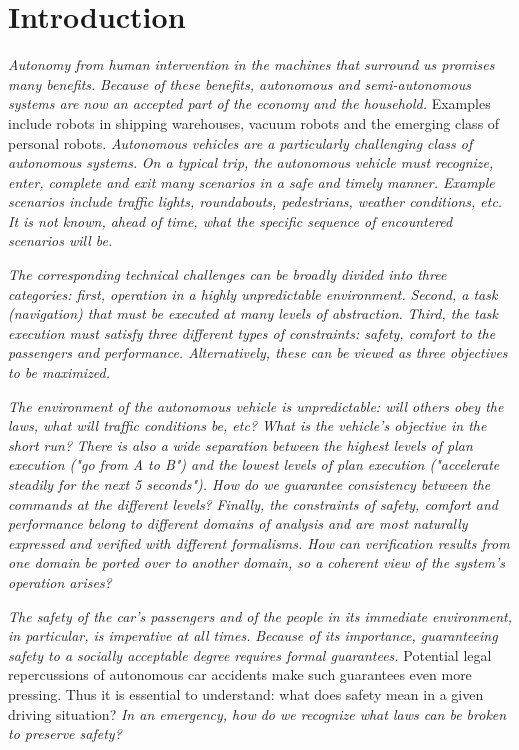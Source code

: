 \section{Introduction}
\label{introduction}

{\it Autonomy from human intervention in the machines that surround us promises many benefits.}
{\it Because of these benefits, autonomous and semi-autonomous systems are now an accepted part of the economy and the household.}
Examples include robots in shipping warehouses, vacuum robots and the emerging class of personal robots.
{\it Autonomous vehicles are a particularly challenging class of autonomous systems.}
{\it On a typical trip, the autonomous vehicle must recognize, enter, complete and exit many scenarios in a safe and timely manner. Example scenarios include traffic lights, roundabouts, pedestrians, weather conditions, etc. 
It is not known, ahead of time, what the specific sequence of encountered scenarios will be.}

{\it The corresponding technical challenges can be broadly divided into three categories: first, operation in a highly unpredictable environment. }
{\it Second, a task (navigation) that must be executed at many levels of abstraction.}
{\it Third, the task execution must satisfy three different types of constraints: safety, comfort to the passengers and performance. Alternatively, these can be viewed as three objectives to be maximized.}

{\it The environment of the autonomous vehicle is unpredictable: will others obey the laws, what will traffic conditions be, etc? What is the vehicle's objective in the short run?}
{\it There is also a wide separation between the highest levels of plan execution ("go from A to B") and the lowest levels of plan execution ("accelerate steadily for the next 5 seconds"). How do we guarantee consistency between the commands at the different levels?}
{\it Finally, the constraints of safety, comfort and performance belong to different domains of analysis and are most naturally expressed and verified with different formalisms.
	How can verification results from one domain be ported over to another domain, so a coherent view of the system's operation arises?}

{\it The safety of the car's passengers and of the people in its immediate environment, in particular, is imperative at all times.}
{\it Because of its importance, guaranteeing safety to a socially acceptable degree requires formal guarantees.}
Potential legal repercussions of autonomous car accidents make such guarantees even more pressing.
Thus it is essential to understand: what does safety mean in a given driving situation?
{\it In an emergency, how do we recognize what laws can be broken to preserve safety?}

